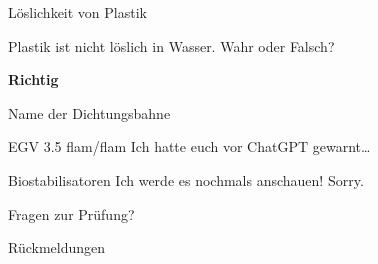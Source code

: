 \begin{frame}{Löslichkeit von Plastik}
    \begin{block}{Plastik ist nicht löslich in Wasser.}
        Wahr oder Falsch?
    \end{block}

    \pause
    \vspace{\baselineskip}
    \textbf{Richtig}

\end{frame}

\begin{frame}{Name der Dichtungsbahne}
    \begin{block}{EGV 3.5 flam/flam}
        Ich hatte euch vor ChatGPT gewarnt\dots
        
    \end{block}

\end{frame}

\begin{frame}{Biostabilisatoren}
    Ich werde es nochmals anschauen! Sorry.

\end{frame}

\begin{frame}{Fragen zur Prüfung?}

\end{frame}

\begin{frame}{Rückmeldungen}

\end{frame}



